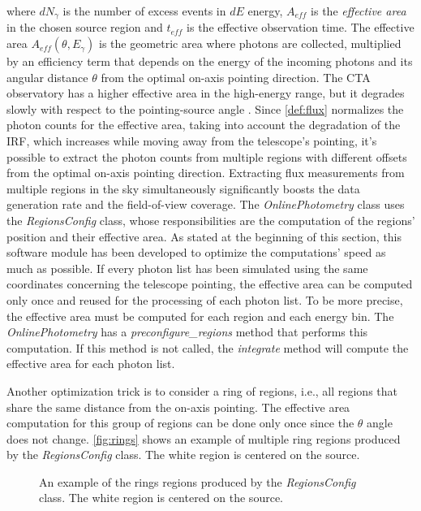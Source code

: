 where $dN_\gamma$ is the number of excess events in $dE$ energy, $A_{eff}$ is the \textit{effective area} in the chosen source region and $t_{eff}$ is the effective observation time. The effective area $A_{eff}(\theta,E_\gamma)$ is the geometric area where photons are collected, multiplied by an efficiency term that depends on the energy of the incoming photons and its angular distance $\theta$ from the optimal on-axis pointing direction. The CTA observatory has a higher effective area in the high-energy range, but it degrades slowly with respect to the pointing-source angle \cite{tampieri2020real}. Since  \autoref{def:flux} normalizes the photon counts for the effective area, taking into account the degradation of the IRF, which increases while moving away from the telescope's pointing, it's possible to extract the photon counts from multiple regions with different offsets from the optimal on-axis pointing direction. Extracting flux measurements from multiple regions in the sky simultaneously significantly boosts the data generation rate and the field-of-view coverage.
The \textit{OnlinePhotometry} class uses the \textit{RegionsConfig} class, whose responsibilities are the computation of the regions' position and their effective area. As stated at the beginning of this section, this software module has been developed to optimize the computations' speed as much as possible. If every photon list has been simulated using the same coordinates concerning the telescope pointing, the effective area can be computed only once and reused for the processing of each photon list. To be more precise, the effective area must be computed for each region and each energy bin. The \textit{OnlinePhotometry} has a \textit{preconfigure\_regions} method that performs this computation. If this method is not called, the \textit{integrate} method will compute the effective area for each photon list.

Another optimization trick is to consider a ring of regions, i.e., all regions that share the same distance from the on-axis pointing. The effective area computation for this group of regions can be done only once since the $\theta$ angle does not change. \autoref{fig:rings} shows an example of multiple ring regions produced by the \textit{RegionsConfig} class. The white region is centered on the source.
\begin{figure}[t]
\centering

\caption{An example of the rings regions produced by the \textit{RegionsConfig} class. The white region is centered on the source.}
\label{fig:rings}
\end{figure}





